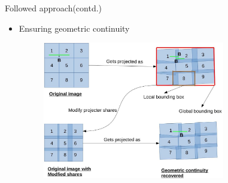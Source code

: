 \documentclass{beamer}
\begin{document}
\begin{frame}{Followed approach(contd.)}
\begin{itemize}
\item Ensuring geometric continuity
\begin{figure}
\includegraphics[width=8cm,height=6cm]{figures/continuity_better.jpg}
\end{figure}
\end{itemize}
\end{frame}


\end{document}
